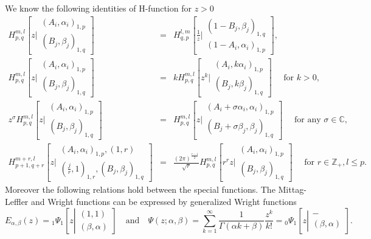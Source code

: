\documentclass[12pt]{article}
\theoremstyle{definition}
\begin{document}
We know the following identities of H-function for $z>0$
\begin{eqnarray}
H^{m,l}_{p,q}\left[z\biggr\vert\begin{array}{c}
(A_i,\alpha_i)_{1,p}\\
(B_j,\beta_j)_{1,q}
\end{array}\right] & = & H^{l,m}_{q,p}\left[\frac{1}{z}\biggr\vert\begin{array}{c}
(1-B_j,\beta_j)_{1,q}\\
(1-A_i,\alpha_i)_{1,p}
\end{array}\right],\label{eq9}\\
H^{m,l}_{p,q}\left[z\biggr\vert\begin{array}{c}
(A_i,\alpha_i)_{1,p}\\
(B_j,\beta_j)_{1,q}
\end{array}\right] & = & k H^{m,l}_{p,q}\left[z^k\biggr\vert\begin{array}{c}
(A_i,k\alpha_i)_{1,p}\\
(B_j,k\beta_j)_{1,q}
\end{array}\right]\quad\mbox{ for } k>0,\label{eq10}\\
z^\sigma H^{m,l}_{p,q}\left[z\biggr\vert\begin{array}{c}
(A_i,\alpha_i)_{1,p}\\
(B_j,\beta_j)_{1,q}
\end{array}\right] & = & H^{m,l}_{p,q}\left[z\biggr\vert\begin{array}{c}
(A_i+\sigma\alpha_i,\alpha_i)_{1,p}\\
(B_j+\sigma\beta_j,\beta_j)_{1,q}
\end{array}\right]\quad\mbox{ for any } \sigma\in\mathbb{C},\label{eq11}\\
H^{m+r,l}_{p+1,q+r}\left[z\biggr\vert\begin{array}{c}
(A_i,\alpha_i)_{1,p},(1,r)\\
\left(\frac{j}{r},1\right)_{1,r},(B_j,\beta_j)_{1,q}
\end{array}\right] & = & \frac{(2\pi)^{\frac{r-1}{2}}}{\sqrt{r}}H^{m,l}_{p,q}\left[r^r z\biggr\vert\begin{array}{c}
(A_i,\alpha_i)_{1,p}\\
(B_j,\beta_j)_{1,q}
\end{array}\right]\quad\mbox{ for } r\in\mathbb{Z}_+, l\leq p .\label{eq12}
\end{eqnarray}
Moreover the following relations hold between the special functions. The Mittag-Leffler and Wright functions can be expressed by generalized Wright functions
\begin{equation}\label{eq13}
E_{\alpha,\beta}(z) = {}_1\Psi_1\left[z\left|\begin{array}{c}
(1,1)\\
(\beta,\alpha)
\end{array}\right.
\right] \quad\mbox{and}\quad
\Psi\left(z;\alpha,\beta\right) = \sum\limits_{k=1}^\infty \frac{1}{\Gamma(\alpha k+\beta)}\frac{z^k}{k!}={}_0\Psi_{1}\left[z\left|\begin{array}{c}
-\\
(\beta,\alpha)
\end{array}\right.\right].
\end{equation}
\end{document}
